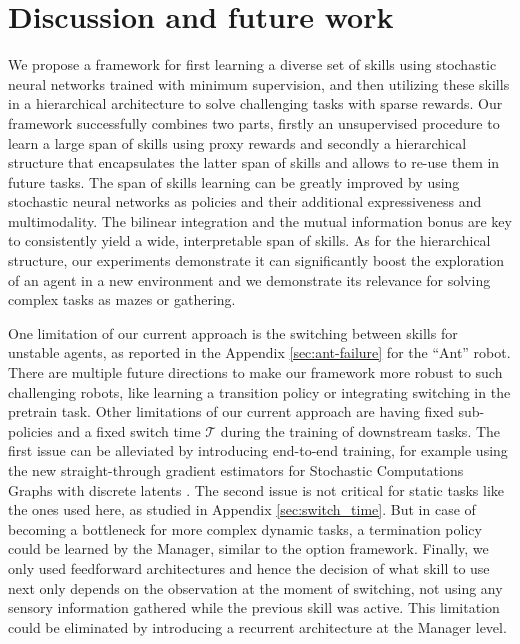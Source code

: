 \documentclass{article} %
\begin{document}
\section{Discussion and future work}
We propose a framework for first learning a diverse set of skills using stochastic neural networks trained with minimum supervision, and then utilizing these skills in a hierarchical architecture to solve challenging tasks with sparse rewards. Our framework successfully combines two parts, firstly an unsupervised procedure to learn a large span of skills using proxy rewards and secondly a hierarchical structure that encapsulates the latter span of skills and allows to re-use them in future tasks. The span of skills learning can be greatly improved by using stochastic neural networks as policies and their additional expressiveness and multimodality. The bilinear integration and the mutual information bonus are key to consistently yield a wide, interpretable span of skills. As for the hierarchical structure, our experiments demonstrate it can significantly boost the exploration of an agent in a new environment and we demonstrate its relevance for solving complex tasks as mazes or gathering. 

One limitation of our current approach is the switching between skills for unstable agents, as reported in the Appendix \ref{sec:ant-failure} for the “Ant” robot. There are multiple future directions to make our framework more robust to such challenging robots, like learning a transition policy or integrating switching in the pretrain task. 
Other limitations of our current approach are having fixed sub-policies and a fixed switch time $\mathcal{T}$ during the training of downstream tasks. The first issue can be alleviated by introducing end-to-end training, for example using the new straight-through gradient estimators for Stochastic Computations Graphs with discrete latents \citep{jang2016gumbel, maddison2016concrete}. The second issue is not critical for static tasks like the ones used here, as studied in Appendix \ref{sec:switch_time}. But in case of becoming a bottleneck for more complex dynamic tasks, a termination policy could be learned by the Manager, similar to the option framework.
Finally, we only used feedforward architectures and hence the decision of what skill to use next only depends on the observation at the moment of switching, not using any sensory information gathered while the previous skill was active. This limitation could be eliminated by introducing a recurrent architecture at the Manager level.
\end{document}
